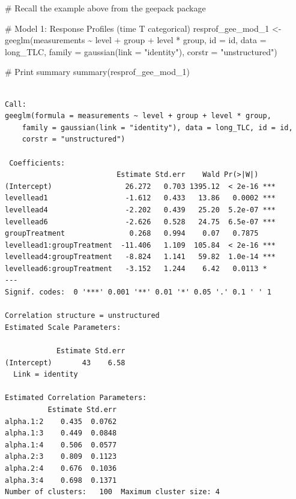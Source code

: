 \documentclass[
  letterpaper,
  DIV=11,
  numbers=noendperiod]{scrreprt}
\newenvironment{Shaded}{\begin{snugshade}}{\end{snugshade}}
\newcommand{\AttributeTok}[1]{\textcolor[rgb]{0.40,0.45,0.13}{#1}}
\newcommand{\CommentTok}[1]{\textcolor[rgb]{0.37,0.37,0.37}{#1}}
\newcommand{\FunctionTok}[1]{\textcolor[rgb]{0.28,0.35,0.67}{#1}}
\newcommand{\NormalTok}[1]{\textcolor[rgb]{0.00,0.23,0.31}{#1}}
\newcommand{\OtherTok}[1]{\textcolor[rgb]{0.00,0.23,0.31}{#1}}
\newcommand{\SpecialCharTok}[1]{\textcolor[rgb]{0.37,0.37,0.37}{#1}}
\newcommand{\StringTok}[1]{\textcolor[rgb]{0.13,0.47,0.30}{#1}}
\begin{document}
\begin{Shaded}
\begin{Highlighting}[]
\CommentTok{\# Recall the example above from the geepack package}

\CommentTok{\# Model 1: Response Profiles (time T categorical)}
\NormalTok{resprof\_gee\_mod\_1 }\OtherTok{\textless{}{-}} \FunctionTok{geeglm}\NormalTok{(measurements }\SpecialCharTok{\textasciitilde{}}\NormalTok{ level }\SpecialCharTok{+}\NormalTok{ group }\SpecialCharTok{+}\NormalTok{ level }\SpecialCharTok{*}\NormalTok{ group, }\AttributeTok{id =}\NormalTok{ id,}
    \AttributeTok{data =}\NormalTok{ long\_TLC, }\AttributeTok{family =} \FunctionTok{gaussian}\NormalTok{(}\AttributeTok{link =} \StringTok{"identity"}\NormalTok{), }\AttributeTok{corstr =} \StringTok{"unstructured"}\NormalTok{)}

\CommentTok{\# Print summary}
\FunctionTok{summary}\NormalTok{(resprof\_gee\_mod\_1)}
\end{Highlighting}
\end{Shaded}

\begin{verbatim}

Call:
geeglm(formula = measurements ~ level + group + level * group, 
    family = gaussian(link = "identity"), data = long_TLC, id = id, 
    corstr = "unstructured")

 Coefficients:
                          Estimate Std.err    Wald Pr(>|W|)    
(Intercept)                 26.272   0.703 1395.12  < 2e-16 ***
levellead1                  -1.612   0.433   13.86   0.0002 ***
levellead4                  -2.202   0.439   25.20  5.2e-07 ***
levellead6                  -2.626   0.528   24.75  6.5e-07 ***
groupTreatment               0.268   0.994    0.07   0.7875    
levellead1:groupTreatment  -11.406   1.109  105.84  < 2e-16 ***
levellead4:groupTreatment   -8.824   1.141   59.82  1.0e-14 ***
levellead6:groupTreatment   -3.152   1.244    6.42   0.0113 *  
---
Signif. codes:  0 '***' 0.001 '**' 0.01 '*' 0.05 '.' 0.1 ' ' 1

Correlation structure = unstructured 
Estimated Scale Parameters:

            Estimate Std.err
(Intercept)       43    6.58
  Link = identity 

Estimated Correlation Parameters:
          Estimate Std.err
alpha.1:2    0.435  0.0762
alpha.1:3    0.449  0.0848
alpha.1:4    0.506  0.0577
alpha.2:3    0.809  0.1123
alpha.2:4    0.676  0.1036
alpha.3:4    0.698  0.1371
Number of clusters:   100  Maximum cluster size: 4 
\end{verbatim}
\end{document}
